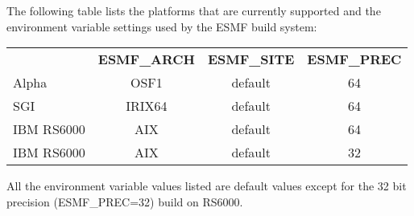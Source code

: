 

The following table lists the platforms that are currently supported
and the environment variable settings used by the ESMF build system: \vspace{1ex}

\begin{tabular}{lccc}
  &{\bfseries ESMF\_ARCH}  & {\bfseries ESMF\_SITE } & {\bfseries ESMF\_PREC} \\

Alpha       &  OSF1    &  default &  64 \\
SGI         &  IRIX64  &  default &  64 \\
IBM RS6000  &  AIX     &  default &  64 \\
IBM RS6000  &  AIX     &  default &  32 

\end{tabular}

\vspace{1ex}

All the environment variable values listed are default values except
for the 32 bit precision (ESMF\_PREC=32) build on RS6000.  


